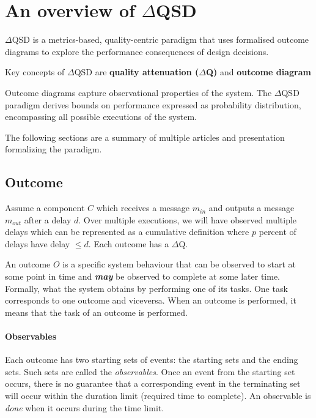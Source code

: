 \section{An overview of $\Delta$QSD}
    $\Delta$QSD is a metrics-based, quality-centric paradigm that uses formalised outcome diagrams to explore the performance consequences of design decisions. \cite{myo}
    
    Key concepts of $\Delta$QSD are \textbf{quality attenuation ($\Delta$Q)} and \textbf{outcome diagram}

    Outcome diagrams capture observational properties of the system. The $\Delta$QSD paradigm derives bounds on performance expressed as probability distribution, encompassing all possible executions of the system. 
 
    The following sections are a summary of multiple articles and presentation formalizing the paradigm. \cite{myo} \cite{dq-tut} \cite{art} \cite{dq-br} 
     
 \subsection{Outcome}
    Assume a component $C$ which receives a message $m_{in}$ and outputs a message $m_{out}$ after a delay $d$. Over multiple executions, we will have observed multiple delays which can be represented as a cumulative definition where $p$ percent of delays have delay $\le d$. \cite{art} Each outcome has a $\Delta$Q.

        An outcome $O$ is a specific system behaviour that can be observed to start at some point in time and \textit{\textbf{may}} be observed to complete at some later time. \cite{dq-br}
        Formally, what the system obtains by performing one of its tasks. One task corresponds to one outcome and viceversa. When an outcome is performed, it means that the task of an outcome is performed.
    
    \paragraph{Observables}
    Each outcome has two starting sets of events: the starting sets and the ending sets. Such sets are called the \textit{observables}. Once an event from the starting set occurs, there is no guarantee that a corresponding event in the terminating set will occur within the duration limit (required time to complete). An observable is \textit{done}  when it occurs during the time limit.


